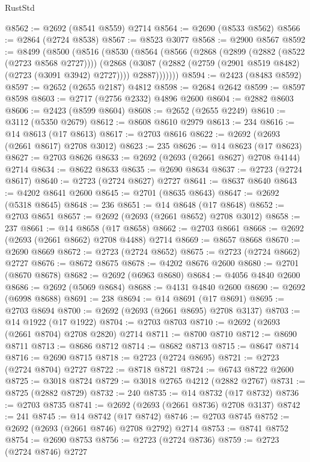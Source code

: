 \begin{lexlean}{RustStd}
\begin{coremodule}
{\begin{coremodule}
{{{{{{{{{{{{{{{{{{{{{{{{{{{{{{{{{{{{{{{@8562 := @2692 (@8541 @8559) @2714
@8564 := @2690 (@8533 @8562)
@8566 := @2864 (@2724 @8538)
@8567 := @8523 @3077
@8568 := @2900 @8567
@8592 := @8499
    (@8500
      (@8516
        (@8530
          (@8564
            (@8566
              (@2868
                (@2899 (@2882 (@8522 (@2723 @8568 @2727))))
                (@2868
                  (@3087 (@2882 (@2759 (@2901 @8519 @8482) (@2723 (@3091 @3942) @2727))))
                  @2887)))))))
@8594 := @2423 (@8483 @8592)
@8597 := @2652 (@2655 @2187) @4812
@8598 := @2684 @2642
@8599 := @8597 @8598
@8603 := @2717 (@2756 @2332) @4896 @2600
@8604 := @2882 @8603
@8606 := @2423 (@8599 @8604)
@8608 := @2652 (@2655 @2249)
@8610 := @3112 (@5350 @2679)
@8612 := @8608 @8610 @2979
@8613 := 234
@8616 := @14 @8613 (@17 @8613)
@8617 := @2703 @8616
@8622 := @2692 (@2693 (@2661 @8617) @2708 @3012)
@8623 := 235
@8626 := @14 @8623 (@17 @8623)
@8627 := @2703 @8626
@8633 := @2692 (@2693 (@2661 @8627) @2708 @4144) @2714
@8634 := @8622 @8633
@8635 := @2690 @8634
@8637 := @2723 (@2724 @8617)
@8640 := @2723 (@2724 @8627) @2727
@8641 := @8637 @8640
@8643 := @4202 @8641 @2600
@8645 := @2701 (@8635 @8643)
@8647 := @2692 (@5318 @8645)
@8648 := 236
@8651 := @14 @8648 (@17 @8648)
@8652 := @2703 @8651
@8657 := @2692 (@2693 (@2661 @8652) @2708 @3012)
@8658 := 237
@8661 := @14 @8658 (@17 @8658)
@8662 := @2703 @8661
@8668 := @2692 (@2693 (@2661 @8662) @2708 @4488) @2714
@8669 := @8657 @8668
@8670 := @2690 @8669
@8672 := @2723 (@2724 @8652)
@8675 := @2723 (@2724 @8662) @2727
@8676 := @8672 @8675
@8678 := @4202 @8676 @2600
@8680 := @2701 (@8670 @8678)
@8682 := @2692 (@6963 @8680)
@8684 := @4056 @4840 @2600
@8686 := @2692 (@5069 @8684)
@8688 := @4131 @4840 @2600
@8690 := @2692 (@6998 @8688)
@8691 := 238
@8694 := @14 @8691 (@17 @8691)
@8695 := @2703 @8694
@8700 := @2692 (@2693 (@2661 @8695) @2708 @3137)
@8703 := @14 @1922 (@17 @1922)
@8704 := @2703 @8703
@8710 := @2692 (@2693 (@2661 @8704) @2708 @2820) @2714
@8711 := @8700 @8710
@8712 := @8690 @8711
@8713 := @8686 @8712
@8714 := @8682 @8713
@8715 := @8647 @8714
@8716 := @2690 @8715
@8718 := @2723 (@2724 @8695)
@8721 := @2723 (@2724 @8704) @2727
@8722 := @8718 @8721
@8724 := @6743 @8722 @2600
@8725 := @3018 @8724
@8729 := @3018 @2765 @4212 (@2882 @2767)
@8731 := @8725 (@2882 @8729)
@8732 := 240
@8735 := @14 @8732 (@17 @8732)
@8736 := @2703 @8735
@8741 := @2692 (@2693 (@2661 @8736) @2708 @3137)
@8742 := 241
@8745 := @14 @8742 (@17 @8742)
@8746 := @2703 @8745
@8752 := @2692 (@2693 (@2661 @8746) @2708 @2792) @2714
@8753 := @8741 @8752
@8754 := @2690 @8753
@8756 := @2723 (@2724 @8736)
@8759 := @2723 (@2724 @8746) @2727
}}}}}}}}}}}}}}}}}}}}}}}}}}}}}}}}}}}}}}}
\end{coremodule}}
\end{coremodule}
\end{lexlean}
